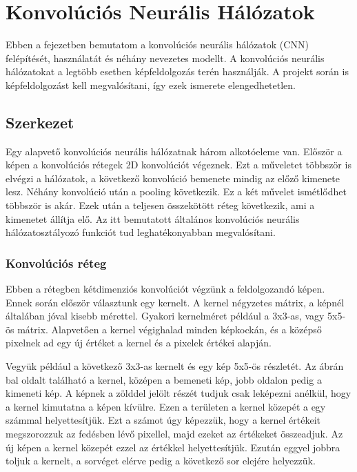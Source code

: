 \newcommand{\cnn}{konvolúciós neurális hálózat}

\chapter{Konvolúciós Neurális Hálózatok}
Ebben a fejezetben bemutatom a \cnn ok (CNN) felépítését, használatát és néhány nevezetes modellt. A \cnn okat a legtöbb esetben képfeldolgozás terén használják. A projekt során is képfeldolgozást kell megvalósítani, így ezek ismerete elengedhetetlen.

\section{Szerkezet}
Egy alapvető \cnn nak három alkotóeleme van. Először a képen a konvolúciós rétegek 2D konvolúciót végeznek. Ezt a műveletet többször is elvégzi a hálózatok, a következő konvolúció bemenete mindig az előző kimenete lesz. Néhány konvolúció után a pooling következik. Ez a két művelet ismétlődhet többször is akár. Ezek után a teljesen összekötött réteg következik, ami a kimenetet állítja elő. Az itt bemutatott általános \cnn osztályozó funkciót tud leghatékonyabban megvalósítani.

\subsection{Konvolúciós réteg}
Ebben a rétegben kétdimenziós konvolúciót végzünk a feldolgozandó képen. Ennek során először választunk egy kernelt. A kernel négyzetes mátrix, a képnél általában jóval kisebb mérettel. Gyakori kernelméret például a 3x3-as, vagy 5x5-ös mátrix. Alapvetően a kernel végighalad minden képkockán, és a középső pixelnek ad egy új értéket a kernel és a pixelek értékei alapján.


Vegyük például a következő 3x3-as kernelt és egy kép 5x5-ös részletét. Az ábrán bal oldalt található a kernel, középen a bemeneti kép, jobb oldalon pedig a kimeneti kép. A képnek a zölddel jelölt részét tudjuk csak leképezni anélkül, hogy a kernel kimutatna a képen kívülre. Ezen a területen a kernel közepét a egy számmal helyettesítjük. Ezt a számot úgy képezzük, hogy a kernel értékeit megszorozzuk az fedésben lévő pixellel, majd ezeket az értékeket összeadjuk. Az új képen a kernel közepét ezzel az értékkel helyettesítjük. Ezután eggyel jobbra toljuk a kernelt, a sorvéget elérve pedig a következő sor elejére helyezzük.

